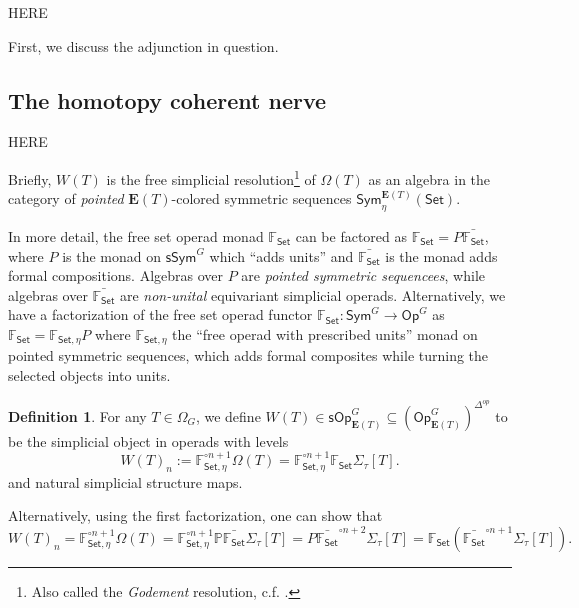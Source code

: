 \documentclass[a4paper,10pt
,draft
]{article}%
\numberwithin{equation}{section}
\numberwithin{figure}{section}
\theoremstyle{definition} %
\newtheorem{definition}[equation]{Definition}%
\newcommand{\Sym}{\ensuremath{\mathsf{Sym}}}%
\newcommand{\Set}{\ensuremath{\mathsf{Set}}}
\newcommand{\Op}{\mathsf{Op}}%
\newcommand{\sOp}{\ensuremath{\mathsf{sOp}}}%
\newcommand{\1}{\ensuremath{\mathbbm 1}}%
\begin{document}
{\color{red} HERE}	


First, we discuss the adjunction in question.

\subsection{The homotopy coherent nerve}

{\color{red} HERE}


Briefly, $W(T)$ is the free simplicial resolution\footnote{Also called the \textit{Godement} resolution, c.f. \cite[\S 8.3]{BM06}.}
of $\Omega(T)$ as an algebra in the category of \textit{pointed} $\mathbf E(T)$-colored symmetric sequences $\Sym^{\mathbf E(T)}_{\eta}(\Set)$.

In more detail, the free set operad monad $\mathbb F_\Set$ can be factored as
$\mathbb F_\Set = P \bar{\mathbb F_\Set}$,
where $P$ is the monad on $\mathsf{sSym}^G$ which ``adds units''
and $\bar{\mathbb F_\Set}$ is the monad adds formal compositions.
Algebras over $P$ are \textit{pointed symmetric sequencees}, while algebras over $\bar{\mathbb F_\Set}$ are \textit{non-unital} equivariant simplicial operads.
Alternatively, we have a factorization of the free set operad functor $\mathbb F_\Set \colon \mathsf{Sym}^G \to \Op^G$ as
$\mathbb F_\Set = \mathbb F_{\Set,\eta} P$
where $\mathbb F_{\Set,\eta}$ the ``free operad with prescribed units'' monad on pointed symmetric sequences,
which adds formal composites while turning the selected objects into units.
\begin{definition}
      For any $T \in \Omega_G$, we define $W(T) \in \sOp_{\boldsymbol{E}(T)}^G \subseteq (\Op_{\boldsymbol{E}(T)}^G)^{\Delta^{op}}$
      to be the simplicial object in operads with levels
      \[
            W(T)_n := \mathbb F_{\Set,\eta}^{\circ n+1}\Omega(T)= \mathbb F_{\Set,\eta}^{\circ n+1}\mathbb F_\Set \Sigma_\tau[T].
      \]
      and natural simplicial structure maps.
\end{definition}
Alternatively, using the first factorization, one can show that
\begin{equation}
      \label{WT_EQ}
      W(T)_n = \mathbb F_{\Set,\eta}^{\circ n+1} \Omega(T)
      = \mathbb F_{\Set,\eta}^{\circ n+1} \mathbb P \bar{\mathbb F_\Set} \Sigma_\tau[T]
      = P \bar{\mathbb F_\Set}^{\circ n+2}\Sigma_\tau[T]
      = \mathbb F_\Set \left( \bar{\mathbb F_\Set}^{\circ n+1} \Sigma_\tau[T] \right).
\end{equation}
\end{document}

